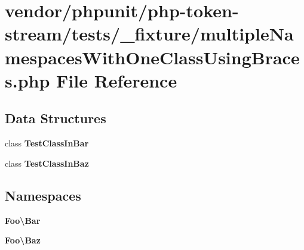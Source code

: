 \section{vendor/phpunit/php-\/token-\/stream/tests/\+\_\+fixture/multiple\+Namespaces\+With\+One\+Class\+Using\+Braces.php File Reference}
\label{multiple_namespaces_with_one_class_using_braces_8php}
\subsection*{Data Structures}
\begin{DoxyCompactItemize}
\item 
class {\bf Test\+Class\+In\+Bar}
\item 
class {\bf Test\+Class\+In\+Baz}
\end{DoxyCompactItemize}
\subsection*{Namespaces}
\begin{DoxyCompactItemize}
\item 
 {\bf Foo\textbackslash{}\+Bar}
\item 
 {\bf Foo\textbackslash{}\+Baz}
\end{DoxyCompactItemize}
